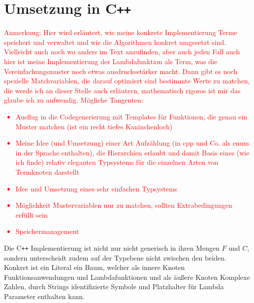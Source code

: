 \documentclass{scrartcl}
\numberwithin{figure}{section} %
\theoremstyle{definition} %
\begin{document}
\section{Umsetzung in C\texttt{++}} \label{secKernUmsetzungInCpp}
\textcolor{red} {
\begin{itshape}
Anmerkung: Hier wird erläutert, wie meine konkrete Implementierung Terme speichert und verwaltet und wie die Algorithmen konkret umgesetzt sind. Vielleicht auch noch wo anders im Text anzufinden, aber auch jeden Fall auch hier ist meine Implementierung der Lambdafunktion als Term, was die Vereinfachungsmuster noch etwas ausdrucksstärker macht. Dann gibt es noch spezielle Matchvariablen, die darauf optimiert sind bestimmte Werte zu matchen, die werde ich an dieser Stelle auch erläutern, mathematisch rigoros ist mir das glaube ich zu aufwendig.
Mögliche Tangenten:
\begin{itemize}
\item {Ausflug in die Codegenerierung mit Templates für Funktionen, die genau ein Muster matchen (ist ein recht tiefes Kaninchenloch)}
\item {Meine Idee (und Umsetzung) einer Art Aufzählung (in cpp und Co. als enum in der Sprache enthalten), die Hierarchien erlaubt und damit Basis eines (wie ich finde) relativ eleganten Typsystems für die einzelnen Arten von Termknoten darstellt}
\item {Idee und Umsetzung eines sehr einfachen Typsystems}
\item{Möglichkeit Mustervariablen nur zu matchen, sollten Extrabedingungen erfüllt sein}
\item {Speichermanagement}
\end{itemize}
\end{itshape}
}

Die C\texttt{++} Implementierung ist nicht nur nicht generisch in ihren Mengen $F$ und $C$, sondern unterscheidt zudem auf der Typebene nicht zwischen den beiden. Konkret ist ein Literal ein Baum, welcher als innere Knoten Funktionsanwendungen und Lambdafunktionen und als äußere Knoten Komplexe Zahlen, durch Strings identifizierte Symbole und Platzhalter für Lambda Parameter enthalten kann. 
\end{document}
